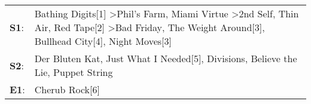 \begin{supertabular}{p{0.03\textwidth}p{0.92\textwidth}}
 \textbf{S1}:  &  Bathing Digits[1]\textsuperscript{} \textgreater \enspace Phil's Farm\textsuperscript{}, \enspace Miami Virtue\textsuperscript{} \textgreater \enspace 2nd Self\textsuperscript{}, \enspace Thin Air\textsuperscript{}, \enspace Red Tape[2]\textsuperscript{} \textgreater \enspace Bad Friday\textsuperscript{}, \enspace The Weight Around[3]\textsuperscript{}, \enspace Bullhead City[4]\textsuperscript{}, \enspace Night Moves[3]\textsuperscript{}  \enspace  \\
 \textbf{S2}:  &                                                                                                                                                                                                                                              Der Bluten Kat\textsuperscript{}, \enspace Just What I Needed[5]\textsuperscript{}, \enspace Divisions\textsuperscript{}, \enspace Believe the Lie\textsuperscript{}, \enspace Puppet String\textsuperscript{}  \enspace  \\
 \textbf{E1}:  &                                                                                                                                                                                                                                                                                                                                                                                                                            Cherub Rock[6]\textsuperscript{}  \enspace  \\
\end{supertabular}
